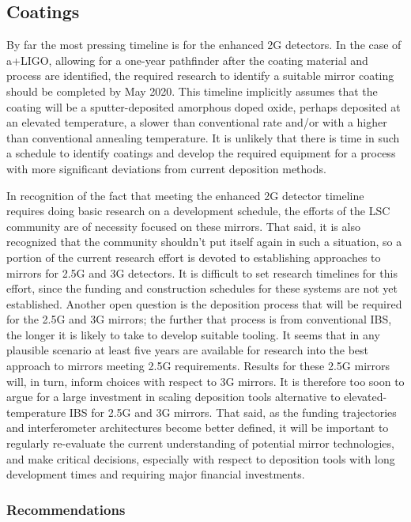 \subsection{Coatings}
By far the most pressing timeline is for the enhanced 2G detectors. In the case of a+LIGO, allowing for a one-year pathfinder after the coating material and process are identified, the required research to identify a suitable mirror coating should be completed by May 2020. This timeline implicitly assumes that the coating will be a sputter-deposited amorphous doped oxide, perhaps deposited at an elevated temperature, a slower than conventional rate and/or with a higher than conventional annealing temperature. It is unlikely that there is time in such a schedule to identify coatings and develop the required equipment for a process with more significant deviations from current deposition methods.

In recognition of the fact that meeting the enhanced 2G detector timeline requires doing basic research on a development schedule, the efforts of the LSC community are of necessity focused on these mirrors. That said, it is also recognized that the community shouldn't put itself again in such a situation, so a portion of the current research effort is devoted to establishing approaches to mirrors for 2.5G and 3G detectors. It is difficult to set research timelines for this effort, since the funding and construction schedules for these systems are not yet established. Another open question is the deposition process that will be required for the 2.5G and 3G mirrors; the further that process is from conventional IBS, the longer it is likely to take to develop suitable tooling. It seems that in any plausible scenario at least five years are available for research into the best approach to mirrors meeting 2.5G requirements. Results for these 2.5G mirrors will, in turn, inform choices with respect to 3G mirrors. It is therefore too soon to argue for a large investment in scaling deposition tools alternative to elevated-temperature IBS for 2.5G and 3G mirrors. That said, as the funding trajectories and interferometer architectures become better defined, it will be important to regularly re-evaluate the current understanding of potential mirror technologies, and make critical decisions, especially with respect to deposition tools with long development times and requiring major financial investments.

\subsubsection{Recommendations}

